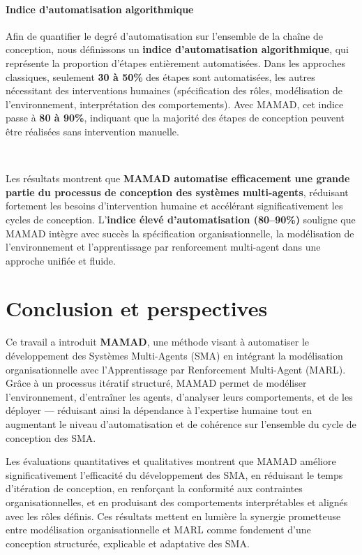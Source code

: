 \documentclass[pdflatex,sn-mathphys-num]{sn-jnl}%
\theoremstyle{thmstyleone}%
\theoremstyle{thmstyletwo}%
\theoremstyle{thmstylethree}%
\begin{document}
\paragraph{Indice d'automatisation algorithmique}

Afin de quantifier le degré d'automatisation sur l'ensemble de la chaîne de conception, nous définissons un \textbf{indice d'automatisation algorithmique}, qui représente la proportion d'étapes entièrement automatisées. Dans les approches classiques, seulement \textbf{30 à 50\%} des étapes sont automatisées, les autres nécessitant des interventions humaines (spécification des rôles, modélisation de l'environnement, interprétation des comportements). Avec MAMAD, cet indice passe à \textbf{80 à 90\%}, indiquant que la majorité des étapes de conception peuvent être réalisées sans intervention manuelle.

\

Les résultats montrent que \textbf{MAMAD automatise efficacement une grande partie du processus de conception des systèmes multi-agents}, réduisant fortement les besoins d'intervention humaine et accélérant significativement les cycles de conception. L'\textbf{indice élevé d'automatisation (80--90\%)} souligne que MAMAD intègre avec succès la spécification organisationnelle, la modélisation de l'environnement et l'apprentissage par renforcement multi-agent dans une approche unifiée et fluide.


\section{Conclusion et perspectives} \label{sec:conclusion}

Ce travail a introduit \textbf{MAMAD}, une méthode visant à automatiser le développement des Systèmes Multi-Agents (SMA) en intégrant la modélisation organisationnelle avec l'Apprentissage par Renforcement Multi-Agent (MARL). Grâce à un processus itératif structuré, MAMAD permet de modéliser l'environnement, d'entraîner les agents, d'analyser leurs comportements, et de les déployer — réduisant ainsi la dépendance à l'expertise humaine tout en augmentant le niveau d'automatisation et de cohérence sur l'ensemble du cycle de conception des SMA.

Les évaluations quantitatives et qualitatives montrent que MAMAD améliore significativement l'efficacité du développement des SMA, en réduisant le temps d'itération de conception, en renforçant la conformité aux contraintes organisationnelles, et en produisant des comportements interprétables et alignés avec les rôles définis. Ces résultats mettent en lumière la synergie prometteuse entre modélisation organisationnelle et MARL comme fondement d'une conception structurée, explicable et adaptative des SMA.
\end{document}
